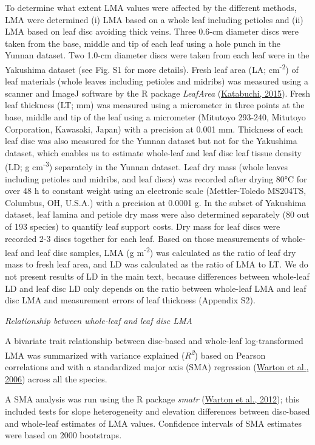 \documentclass[
  12pt,
  a4paper,
,tablecaptionabove
]{scrartcl}
\begin{document}
To determine what extent LMA values were affected by the different methods, LMA were determined (i) LMA based on a whole leaf including petioles and (ii) LMA based on leaf disc avoiding thick veins.
Three 0.6-cm diameter discs were taken from the base, middle and tip of each leaf using a hole punch in the Yunnan dataset.
Two 1.0-cm diameter discs were taken from each leaf were in the Yakushima dataset (see Fig. S1 for more details).
Fresh leaf area (LA; cm\textsuperscript{-2}) of leaf materials (whole leaves including petioles and midribs) was measured using a scanner and ImageJ software by the R package \emph{LeafArea} (\protect\hyperlink{ref-Katabuchi2015}{Katabuchi, 2015}).
Fresh leaf thickness (LT; mm) was measured using a micrometer in three points at the base, middle and tip of the leaf using a micrometer (Mitutoyo 293-240, Mitutoyo Corporation, Kawasaki, Japan) with a precision at 0.001 mm.
Thickness of each leaf disc was also measured for the Yunnan dataset but not for the Yakushima dataset, which enables us to estimate whole-leaf and leaf disc leaf tissue density (LD; g cm\textsuperscript{-3}) separately in the Yunnan dataset.
Leaf dry mass (whole leaves including petioles and midribs, and leaf discs) was recorded after drying 80°C for over 48 h to constant weight using an electronic scale (Mettler-Toledo MS204TS, Columbus, OH, U.S.A.) with a precision at 0.0001 g.
In the subset of Yakushima dataset, leaf lamina and petiole dry mass were also determined separately (80 out of 193 species) to quantify leaf support costs.
Dry mass for leaf discs were recorded 2-3 discs together for each leaf.
Based on those measurements of whole-leaf and leaf disc samples, LMA (g m\textsuperscript{-2}) was calculated as the ratio of leaf dry mass to fresh leaf area, and LD was calculated as the ratio of LMA to LT.
We do not present results of LD in the main text, because differences between whole-leaf LD and leaf disc LD only depends on the ratio between whole-leaf LMA and leaf disc LMA and measurement errors of leaf thickness (Appendix S2).

\emph{Relationship between whole-leaf and leaf disc LMA}

A bivariate trait relationship between disc-based and whole-leaf log-transformed LMA was summarized with variance explained (\emph{R\textsuperscript{2}}) based on Pearson correlations and with a standardized major axis (SMA) regression (\protect\hyperlink{ref-Warton2006}{Warton et al., 2006}) across all the species.

A SMA analysis was run using the R package \emph{smatr} (\protect\hyperlink{ref-Warton2012a}{Warton et al., 2012}); this included tests for slope heterogeneity and elevation differences between disc-based and whole-leaf estimates of LMA values.
Confidence intervals of SMA estimates were based on 2000 bootstraps.
\end{document}

